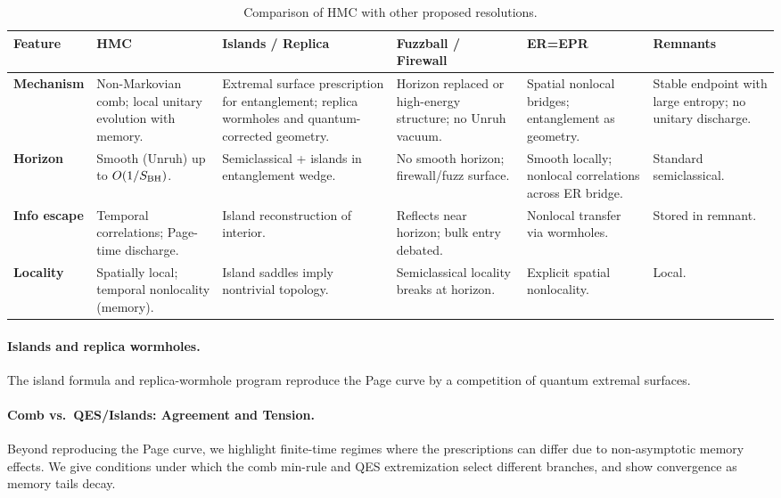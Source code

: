 \documentclass[a4paper,11pt]{article}
\newcommand{\HMC}{\textsc{HMC}\xspace}
\theoremstyle{plain}
\theoremstyle{definition}
\theoremstyle{remark}
\begin{document}
\begin{table}[htbp]
\centering
\caption{Comparison of \HMC{} with other proposed resolutions.}
\label{tab:comparison}
\footnotesize
\setlength{\tabcolsep}{3pt}
\begin{tabularx}{\textwidth}{@{}l *{5}{X}@{}}
\toprule
\textbf{Feature} & \textbf{HMC} & \textbf{Islands / Replica} & \textbf{Fuzzball / Firewall} & \textbf{ER=EPR} & \textbf{Remnants} \\ \midrule
\textbf{Mechanism} & Non-Markovian comb; local unitary evolution with memory. & Extremal surface prescription for entanglement; replica wormholes and quantum-corrected geometry. & Horizon replaced or high-energy structure; no Unruh vacuum. & Spatial nonlocal bridges; entanglement as geometry. & Stable endpoint with large entropy; no unitary discharge. \\
\addlinespace
\textbf{Horizon} & Smooth (Unruh) up to $O(1/S_{\rm BH})$. & Semiclassical + islands in entanglement wedge. & No smooth horizon; firewall/fuzz surface. & Smooth locally; nonlocal correlations across ER bridge. & Standard semiclassical. \\
\addlinespace
\textbf{Info escape} & Temporal correlations; Page-time discharge. & Island reconstruction of interior. & Reflects near horizon; bulk entry debated. & Nonlocal transfer via wormholes. & Stored in remnant. \\
\addlinespace
\textbf{Locality} & Spatially local; temporal nonlocality (memory). & Island saddles imply nontrivial topology. & Semiclassical locality breaks at horizon. & Explicit spatial nonlocality. & Local. \\
\bottomrule
\end{tabularx}
\setlength{\tabcolsep}{6pt}
\vspace{0.5em}
\end{table}

\paragraph{Islands and replica wormholes.}
The island formula and replica-wormhole program \cite{Penington:2020,Almheiri:2020,Chen:2020}
reproduce the Page curve by a competition of quantum extremal surfaces.

\paragraph{Comb vs.\ QES/Islands: Agreement and Tension.}
Beyond reproducing the Page curve, we highlight finite-time regimes where the prescriptions can differ due to non-asymptotic memory effects. We give conditions under which the comb min-rule and QES extremization select different branches, and show convergence as memory tails decay. 
\end{document}
